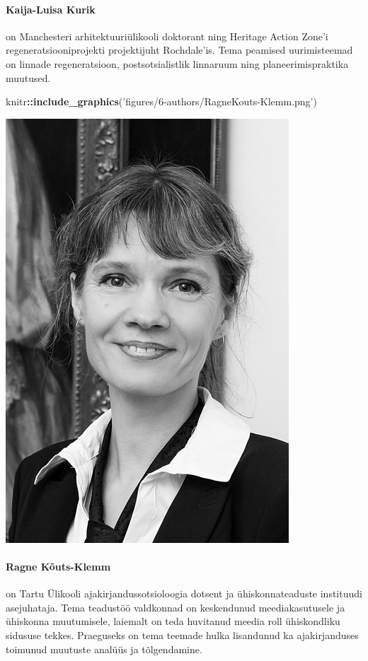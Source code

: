 \documentclass[estonian,]{article}
\newenvironment{Shaded}{\begin{snugshade}}{\end{snugshade}}
\newcommand{\KeywordTok}[1]{\textcolor[rgb]{0.13,0.29,0.53}{\textbf{#1}}}
\newcommand{\NormalTok}[1]{#1}
\newcommand{\OperatorTok}[1]{\textcolor[rgb]{0.81,0.36,0.00}{\textbf{#1}}}
\newcommand{\StringTok}[1]{\textcolor[rgb]{0.31,0.60,0.02}{#1}}
\let\oldparagraph\paragraph
\renewcommand{\paragraph}[1]{\oldparagraph{#1}\mbox{}}
\begin{document}
\hypertarget{kaija-luisa-kurik}{%
\paragraph{Kaija-Luisa Kurik}\label{kaija-luisa-kurik}}

on Manchesteri arhitektuuriülikooli doktorant ning Heritage Action Zone'i regeneratsiooniprojekti projektijuht Rochdale'is. Tema peamised uurimisteemad on linnade regeneratsioon, postsotsialistlik linnaruum ning planeerimispraktika muutused.

\begin{Shaded}
\begin{Highlighting}[]
\NormalTok{knitr}\OperatorTok{::}\KeywordTok{include_graphics}\NormalTok{(}\StringTok{'figures/6-authors/RagneKouts-Klemm.png'}\NormalTok{)}
\end{Highlighting}
\end{Shaded}

\begin{flushleft}\includegraphics[width=0.5\linewidth]{figures/6-authors/RagneKouts-Klemm} \end{flushleft}

\hypertarget{ragne-kuxf5uts-klemm}{%
\paragraph{Ragne Kõuts-Klemm}\label{ragne-kuxf5uts-klemm}}

on Tartu Ülikooli ajakirjandussotsioloogia dotsent ja ühiskonnateaduste instituudi asejuhataja. Tema teadustöö valdkonnad on keskendunud meediakasutusele ja ühiskonna muutumisele, laiemalt on teda huvitanud meedia roll ühiskondliku sidususe tekkes. Praeguseks on tema teemade hulka lisandunud ka ajakirjanduses toimunud muutuste analüüs ja tõlgendamine.
\end{document}
